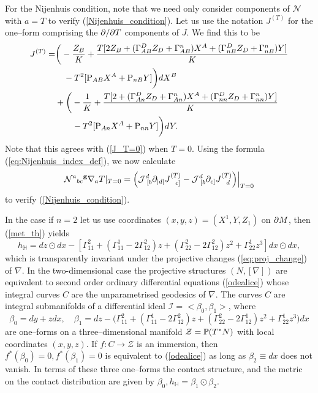 For the Nijenhuis condition, note that we need only consider components of $\mathcal{N}$ with $a=T$ to verify (\ref{Nijenhuis_condition}). Let us use the notation $J^{(T)}$ for the one--form comprising the $\partial/\partial T$ components of $J$. We find this to be
\[
\begin{split}
J^{(T)}=&\bigg(-\frac{Z_B}{K} + \frac{T[2Z_B + (\Gamma^D_{AB}Z_D+\Gamma^n_{AB})X^A + (\Gamma^D_{nB}Z_D+\Gamma^n_{nB})Y]}{K} \\
&\quad - T^2[\mathrm{P}_{AB}X^A+\mathrm{P}_{nB}Y]\bigg)dX^B \\
&+\bigg(-\frac{1}{K} + \frac{T[2 + (\Gamma^D_{An}Z_D+\Gamma^n_{An})X^A + (\Gamma^D_{nn}Z_D+\Gamma^n_{nn})Y]}{K} \\
&\qquad - T^2[\mathrm{P}_{An}X^A+\mathrm{P}_{nn}Y]\bigg)dY.
\end{split}
\]
Note that this agrees with (\ref{J_T=0}) when $T=0$. Using the formula (\ref{eq:Nijenhuis_index_def}), we now calculate
\[
{\mathcal{N}^{a}}_{bc}{^{\bf g}}\nabla_a T|_{T=0}=\Big(\mathcal{J}^d_{\ [b}\p_{|d|}J^{(T)}_{\ \ c]}-\mathcal{J}^d_{\ [b}\p_{c]}J^{(T)}_{\ \ d}\Big)\Big|_{T=0}
\]
to verify (\ref{Nijenhuis_condition}).

\koniec

\begin{rmk}
In the case if $n=2$ let us use coordinates $(x, y, z)=(X^1,Y,Z_1)$ on $\partial M$,  then (\ref{met_th}) yields
\[
h_{ \mathbb{H} }=dz\odot dx-[\Gamma_{11}^2+(\Gamma_{11}^1-2\Gamma_{12}^2)z+(\Gamma_{22}^2-2\Gamma_{12}^2)z^2+
\Gamma_{22}^1z^3]dx\odot dx,
\]
which is transparently invariant under the projective changes (\ref{eq:proj_change}) of $\nabla$.
In the  two-dimensional case the 
projective
structures $(N, [\nabla])$ are equivalent to second order ordinary differential equations (\ref{odealice}) whose integral curves $C$ are the unparametrised geodesics of $\nabla$. The curves $C$ are integral submanifolds
of a  differential
ideal ${\mathcal I}=<\beta_0, \beta_1>$, where
\[
\beta_0=dy+zdx, \quad \beta_1=dz-\Big(\Gamma_{11}^2+(\Gamma_{11}^1-2\Gamma_{12}^2)z+(\Gamma_{22}^2-2\Gamma_{12}^1)z^2+
\Gamma_{22}^1z^3\Big)dx
\]
are one--forms on a three--dimensional manifold $\mathcal{Z}=\mathbb{P}(T^*N)$ with local coordinates $(x, y, z)$. If $f:C\rightarrow \mathcal{Z}$ is an immersion, then $f^*(\beta_0)=0, f^*(\beta_1)=0$ is equivalent
to (\ref{odealice}) as long as $\beta_2\equiv dx$ does not vanish. In terms of these three one--forms
the contact structure, and the metric on the contact distribution are given by
$
\beta_0,  h_{ \mathbb{H} }=\beta_1\odot\beta_2.
$
\end{rmk}

